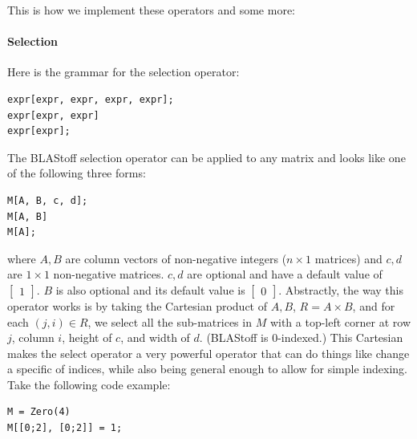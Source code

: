 This is how we implement these operators and some more:

\paragraph{Selection}
Here is the grammar for the selection operator:\begin{lstlisting}
expr[expr, expr, expr, expr];
expr[expr, expr]
expr[expr];
\end{lstlisting}
The BLAStoff selection operator can be applied to any matrix and looks like one of the following three forms:
\begin{lstlisting}
M[A, B, c, d];
M[A, B]
M[A];
\end{lstlisting}
where $A,B$ are column vectors of non-negative integers ($n\times 1$ matrices) and $c,d$ are $1 \times 1$ non-negative matrices.  $c,d$ are optional and have a default value of $\begin{bmatrix}1\end{bmatrix}$. $B$ is also optional and its default value is $\begin{bmatrix}0\end{bmatrix}$.  Abstractly, the way this operator works is by taking the Cartesian product of $A,B$, $R=A\times B$, and for each $(j,i)\in R$, we select all the sub-matrices in $M$ with a top-left corner at row $j$, column $i$, height of $c$, and width of $d$.  (BLAStoff is 0-indexed.)  This Cartesian makes the select operator a very powerful operator that can do things like change a specific of indices, while also being general enough to allow for simple indexing.  Take the following code example:
\begin{lstlisting}
M = Zero(4)
M[[0;2], [0;2]] = 1;
\end{lstlisting}

